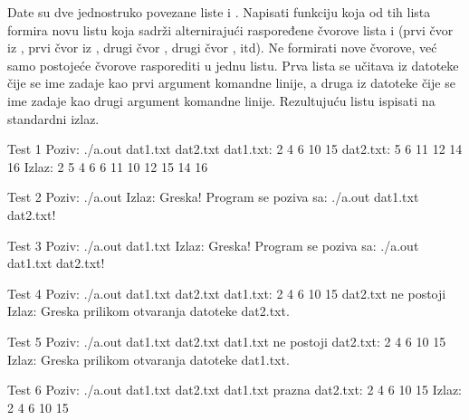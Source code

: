 \begin{Exercise}[label=610]
Date su dve jednostruko povezane liste  i . Napisati funkciju koja od 
tih lista formira novu listu  koja sadrži alternirajući raspoređene čvorove 
lista  i  (prvi čvor iz , prvi čvor iz , drugi čvor ,
drugi čvor , itd). Ne formirati nove čvorove, već samo postojeće čvorove 
rasporediti u jednu listu. Prva lista se učitava iz datoteke čije se ime zadaje kao prvi argument komandne linije, a druga iz datoteke čije se ime zadaje kao 
drugi argument komandne linije. Rezultujuću listu ispisati na standardni izlaz. 

\noindent
\begin{miditest}
\begin{test}{Test 1}
Poziv: ./a.out dat1.txt dat2.txt
dat1.txt: 2 4 6 10 15
dat2.txt: 5 6 11 12 14 16
Izlaz:  
  2 5 4 6 6 11 10 12 15 14 16
\end{test}
\end{miditest}
\begin{miditest}
\begin{test}{Test 2}
Poziv: ./a.out
Izlaz: 
  Greska! Program se poziva sa: 
  ./a.out dat1.txt dat2.txt!
\end{test}
\end{miditest}  
\begin{miditest}
\begin{test}{Test 3}
Poziv: ./a.out dat1.txt 
Izlaz: 
  Greska! Program se poziva sa: 
  ./a.out dat1.txt dat2.txt!
\end{test}
\end{miditest}
\begin{miditest}
\begin{test}{Test 4}
Poziv: ./a.out dat1.txt dat2.txt
dat1.txt: 2 4 6 10 15
dat2.txt ne postoji
Izlaz: 
  Greska prilikom otvaranja datoteke 
  dat2.txt.
\end{test}
\end{miditest}
\begin{miditest}
\begin{test}{Test 5}
Poziv: ./a.out dat1.txt dat2.txt
dat1.txt ne postoji
dat2.txt: 2 4 6 10 15
Izlaz: 
  Greska prilikom otvaranja datoteke 
  dat1.txt.
\end{test}
\end{miditest}
\begin{miditest}
\begin{test}{Test 6}
Poziv: ./a.out dat1.txt dat2.txt
dat1.txt prazna
dat2.txt: 2 4 6 10 15
Izlaz: 
  2 4 6 10 15
\end{test}
\end{miditest}
\end{Exercise}
\begin{Answer}[ref=610]
\end{Answer}

